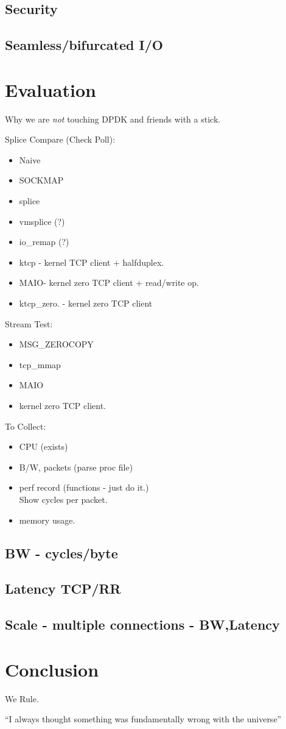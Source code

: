 \documentclass[newfonts=false,format=sigconf,9pt,letterpaper]{acmart}
\newcommand{\oursys}{MAIO\xspace}
\begin{document}
\subsection{Security}
\subsection{Seamless/bifurcated I/O}
\section{Evaluation}
Why we are \emph{not} touching DPDK and friends with a stick.

Splice Compare (Check Poll):
\begin{itemize}
    \item Naive
    \item SOCKMAP
    \item splice
    \item vmsplice  (?)
    \item io\_remap (?)
    \item ktcp - kernel TCP client + halfduplex.
    \item \oursys - kernel zero TCP client + read/write op. 
    \item ktcp\_zero. - kernel zero TCP client
\end{itemize}
\smallskip
Stream Test:
\begin{itemize}
    \item MSG\_ZEROCOPY
    \item tcp\_mmap
    \item \oursys
    \item kernel zero TCP client.
\end{itemize}
\smallskip
To Collect:
\begin{itemize}
    \item CPU (exists)
    \item B/W, packets (parse proc file)
    \item perf record (functions - just do it.)\\
    Show cycles per packet.
    \item memory usage.
\end{itemize}
\subsection{BW - cycles/byte}
\subsection{Latency TCP/RR}
\subsection{Scale - multiple connections - BW,Latency}
\section{Conclusion}
We Rule.

``I always thought something was fundamentally wrong with the universe'' \citep{adams1995hitchhiker}



\end{document}

